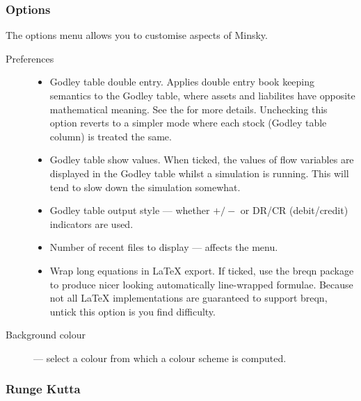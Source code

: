 \subsubsection{Options}
\label{Options}

The options menu allows you to customise aspects of Minsky.

\begin{description}
\item[Preferences]

\begin{itemize}
\item Godley table double entry. Applies double entry book keeping
semantics to the Godley table, where assets and liabilites have
opposite mathematical meaning. See the  for more details. Unchecking this option reverts to a
simpler mode where each stock (Godley table column) is treated the
same.
\item Godley table show values. When ticked, the values of flow
variables are displayed in the Godley table whilst a simulation is
running. This will tend to slow down the simulation somewhat.
\item Godley table output style --- whether $+/-$ or DR/CR (debit/credit)
indicators are used.
\item Number of recent files to display --- affects the  menu.
\item\label{wrap-equations} Wrap long equations in LaTeX export. If ticked, use the breqn
package to produce nicer looking automatically line-wrapped
formulae. Because not all LaTeX implementations are guaranteed to
support breqn, untick this option is you find difficulty.
\end{itemize}

\item[Background colour] --- select a colour from which a colour scheme
is computed.

\end{description}

\subsubsection{Runge Kutta}
\label{RungeKutta}

